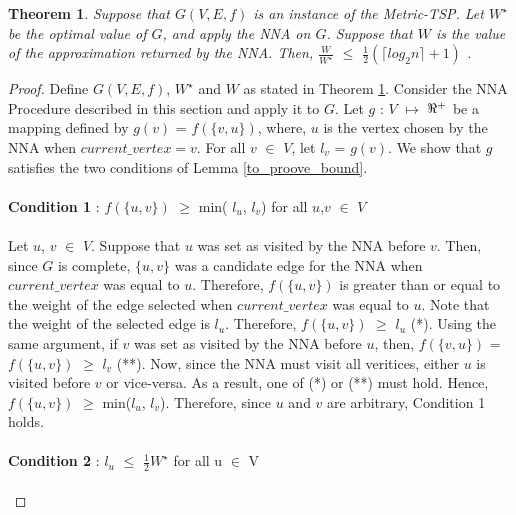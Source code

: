 \documentclass{article}
\newtheorem{theorem}[definition]{Theorem}
\begin{document}
\begin{theorem}
\label{log_bound_thrm}
Suppose that $G(V,E,f)$ is an instance of the Metric-TSP. Let $W^\star$ be the optimal value of $G$, and apply the NNA on $G$. Suppose that $W$ is the value of the approximation returned by the NNA. Then, $\frac{W}{W^\star}$ $\leq$ $\frac{1}{2}(\lceil log_2 n \rceil + 1)$ {\normalfont\cite{Rosenkrantz}}.
\end{theorem}
\begin{proof}
Define $G(V,E,f)$, $W^\star$ and $W$ as stated in Theorem \ref{log_bound_thrm}. Consider the NNA Procedure described in this section and apply it to $G$. Let $g$ : $V$ $\mapsto$ $\real^+$ be a mapping defined by $g(v)$ = $f(\{v,u\})$, where, $u$ is the vertex chosen by the NNA when $current\_vertex = v$. For all $v$ $\in$ $V$, let $l_v$ = $g(v)$. We show that $g$ satisfies the two conditions of Lemma \ref{to_proove_bound}.\\\\
\textbf{Condition 1} :  $f(\{u, v\})$ $\geq$ min( $l_u$, $l_v$) for all $u$,$v$ $\in$ $V$\\\\
Let $u$, $v$ $\in$ $V$. Suppose that $u$ was set as visited by the NNA before $v$. Then, since $G$ is complete, $\{u, v\}$ was a candidate edge for the NNA when $current\_vertex$ was equal to $u$. Therefore, $f(\{u, v\})$ is greater than or equal to the weight of the edge selected when $current\_vertex$ was equal to $u$. Note that the weight of the selected edge is $l_u$. Therefore, $f(\{u, v\})$ $\geq$ $l_u$ (*). Using the same argument, if $v$ was set as visited by the NNA before $u$, then, $f(\{v, u\})$ = $f(\{u, v\})$ $\geq$ $l_v$ (**). Now, since the NNA must visit all veritices, either $u$ is visited before $v$ or vice-versa. As a result, one of (*) or (**) must hold. Hence, $f(\{u, v\})$ $\geq$ min($l_u$, $l_v$). Therefore, since $u$ and $v$ are arbitrary, Condition 1 holds.\\\\
\textbf{Condition 2} :  $l_u$ $\leq$ $\frac{1}{2}W^\star$ for all u $\in$ V\\\\

\end{proof}
\end{document}
